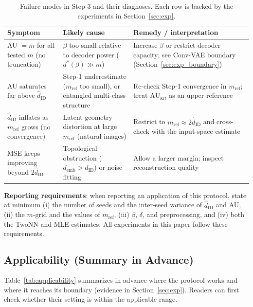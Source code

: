 \documentclass[make,article,submit,pdftex,moreauthors]{Definitions/mdpi}
\newcommand{\dID}{d_{\mathrm{ID}}}
\newcommand{\hatdID}{\hat{d}_{\mathrm{ID}}}
\newcommand{\AUsat}{\mathrm{AU}_{\mathrm{sat}}}
\newcommand{\demb}{d_{\mathrm{emb}}}
\newcommand{\dstar}{d^{*}(\beta)}
\begin{document}
\begin{table}[H]
\caption{Failure modes in Step 3 and their diagnoses. Each row is backed by
the experiments in Section~\ref{sec:exp}.}
\label{tab:failure}
\small
\begin{tabular}{p{3.9cm}p{4.3cm}p{4.3cm}}
\toprule
\textbf{Symptom} & \textbf{Likely cause} & \textbf{Remedy / interpretation} \\
\midrule
AU $= m$ for all tested $m$ (no truncation) & $\beta$ too small relative to decoder power ($\dstar \gg m$) & Increase $\beta$ or restrict decoder capacity; see Conv-VAE boundary (Section~\ref{sec:exp_boundary}) \\
AU saturates far above $\hatdID$ & Step-1 underestimate ($m_{\mathrm{ref}}$ too small), or entangled multi-class structure & Re-check Step-1 convergence in $m_{\mathrm{ref}}$; treat $\AUsat$ as an upper reference \\
$\hatdID$ inflates as $m_{\mathrm{ref}}$ grows (no convergence) & Latent-geometry distortion at large $m_{\mathrm{ref}}$ (natural images) & Restrict to $m_{\mathrm{ref}} \approx 2\hatdID$ and cross-check with the input-space estimate \\
MSE keeps improving beyond $2\hatdID$ & Topological obstruction ($\demb > \dID$) or noise fitting & Allow a larger margin; inspect reconstruction quality \\
\bottomrule
\end{tabular}
\end{table}

\textbf{Reporting requirements}:
when reporting an application of this protocol, state at minimum
(i) the number of seeds and the inter-seed variance of $\hatdID$ and AU,
(ii) the $m$-grid and the values of $m_{\mathrm{ref}}$,
(iii) $\beta$, $\delta$, and preprocessing, and
(iv) both the TwoNN and MLE estimates.
All experiments in this paper follow these requirements.

\subsection{Applicability (Summary in Advance)}\label{sec:protocol_applicability}

Table~\ref{tab:applicability} summarizes in advance where the protocol works
and where it reaches its boundary (evidence in Section~\ref{sec:exp}).
Readers can first check whether their setting is within the applicable
range.
\end{document}

